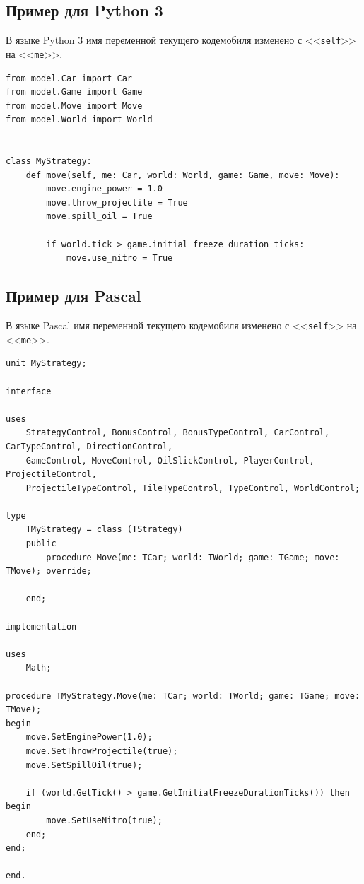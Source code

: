 \subsection{Пример для Python 3}

В языке Python 3 имя переменной текущего кодемобиля изменено с <<\texttt{self}>> на <<\texttt{me}>>.

\begin{verbatim}
from model.Car import Car
from model.Game import Game
from model.Move import Move
from model.World import World


class MyStrategy:
    def move(self, me: Car, world: World, game: Game, move: Move):
        move.engine_power = 1.0
        move.throw_projectile = True
        move.spill_oil = True

        if world.tick > game.initial_freeze_duration_ticks:
            move.use_nitro = True
\end{verbatim}

\newpage
\subsection{Пример для Pascal}

В языке Pascal имя переменной текущего кодемобиля изменено с <<\texttt{self}>> на <<\texttt{me}>>.

\begin{verbatim}
unit MyStrategy;

interface

uses
    StrategyControl, BonusControl, BonusTypeControl, CarControl, CarTypeControl, DirectionControl,
    GameControl, MoveControl, OilSlickControl, PlayerControl, ProjectileControl,
    ProjectileTypeControl, TileTypeControl, TypeControl, WorldControl;

type
    TMyStrategy = class (TStrategy)
    public
        procedure Move(me: TCar; world: TWorld; game: TGame; move: TMove); override;

    end;

implementation

uses
    Math;
    
procedure TMyStrategy.Move(me: TCar; world: TWorld; game: TGame; move: TMove);
begin
    move.SetEnginePower(1.0);
    move.SetThrowProjectile(true);
    move.SetSpillOil(true);

    if (world.GetTick() > game.GetInitialFreezeDurationTicks()) then begin
        move.SetUseNitro(true);
    end;
end;

end.
\end{verbatim}

